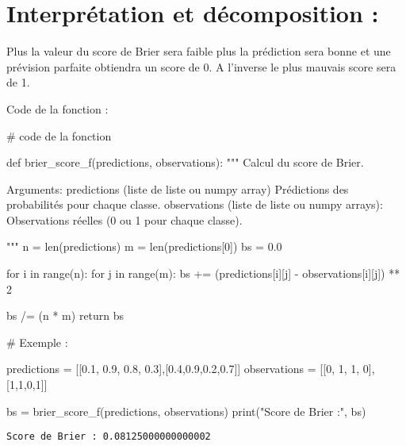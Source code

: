 \documentclass[
  letterpaper,
  DIV=11,
  numbers=noendperiod]{scrartcl}
\newenvironment{Shaded}{\begin{snugshade}}{\end{snugshade}}
\newcommand{\BuiltInTok}[1]{\textcolor[rgb]{0.00,0.23,0.31}{#1}}
\newcommand{\CommentTok}[1]{\textcolor[rgb]{0.37,0.37,0.37}{#1}}
\newcommand{\ControlFlowTok}[1]{\textcolor[rgb]{0.00,0.23,0.31}{#1}}
\newcommand{\DecValTok}[1]{\textcolor[rgb]{0.68,0.00,0.00}{#1}}
\newcommand{\FloatTok}[1]{\textcolor[rgb]{0.68,0.00,0.00}{#1}}
\newcommand{\KeywordTok}[1]{\textcolor[rgb]{0.00,0.23,0.31}{#1}}
\newcommand{\NormalTok}[1]{\textcolor[rgb]{0.00,0.23,0.31}{#1}}
\newcommand{\OperatorTok}[1]{\textcolor[rgb]{0.37,0.37,0.37}{#1}}
\newcommand{\StringTok}[1]{\textcolor[rgb]{0.13,0.47,0.30}{#1}}
\begin{document}
\hypertarget{interpruxe9tation-et-duxe9composition}{%
\section{Interprétation et décomposition
:}\label{interpruxe9tation-et-duxe9composition}}

Plus la valeur du score de Brier sera faible plus la prédiction sera
bonne et une prévision parfaite obtiendra un score de 0. A l'inverse le
plus mauvais score sera de 1.

Code de la fonction :

\begin{Shaded}
\begin{Highlighting}[]
\CommentTok{\# code de la fonction }


\KeywordTok{def}\NormalTok{ brier\_score\_f(predictions, observations):}
    \CommentTok{"""}
\CommentTok{    Calcul du score de Brier.}

\CommentTok{    Arguments:}
\CommentTok{        predictions (liste de liste ou numpy array) Prédictions des probabilités pour chaque classe.}
\CommentTok{        observations (liste de liste ou numpy arrays): Observations réelles (0 ou 1 pour chaque classe).}

\CommentTok{    """}
\NormalTok{    n }\OperatorTok{=} \BuiltInTok{len}\NormalTok{(predictions)}
\NormalTok{    m }\OperatorTok{=} \BuiltInTok{len}\NormalTok{(predictions[}\DecValTok{0}\NormalTok{])}
\NormalTok{    bs }\OperatorTok{=} \FloatTok{0.0}

    \ControlFlowTok{for}\NormalTok{ i }\KeywordTok{in} \BuiltInTok{range}\NormalTok{(n):}
        \ControlFlowTok{for}\NormalTok{ j }\KeywordTok{in} \BuiltInTok{range}\NormalTok{(m):}
\NormalTok{            bs }\OperatorTok{+=}\NormalTok{ (predictions[i][j] }\OperatorTok{{-}}\NormalTok{ observations[i][j]) }\OperatorTok{**} \DecValTok{2}

\NormalTok{    bs }\OperatorTok{/=}\NormalTok{ (n }\OperatorTok{*}\NormalTok{ m)}
    \ControlFlowTok{return}\NormalTok{ bs}


\CommentTok{\# Exemple : }

\NormalTok{predictions }\OperatorTok{=}\NormalTok{ [[}\FloatTok{0.1}\NormalTok{, }\FloatTok{0.9}\NormalTok{, }\FloatTok{0.8}\NormalTok{, }\FloatTok{0.3}\NormalTok{],[}\FloatTok{0.4}\NormalTok{,}\FloatTok{0.9}\NormalTok{,}\FloatTok{0.2}\NormalTok{,}\FloatTok{0.7}\NormalTok{]]}
\NormalTok{observations }\OperatorTok{=}\NormalTok{ [[}\DecValTok{0}\NormalTok{, }\DecValTok{1}\NormalTok{, }\DecValTok{1}\NormalTok{, }\DecValTok{0}\NormalTok{],[}\DecValTok{1}\NormalTok{,}\DecValTok{1}\NormalTok{,}\DecValTok{0}\NormalTok{,}\DecValTok{1}\NormalTok{]]}

\NormalTok{bs }\OperatorTok{=}\NormalTok{ brier\_score\_f(predictions, observations)}
\BuiltInTok{print}\NormalTok{(}\StringTok{"Score de Brier :"}\NormalTok{, bs)}
\end{Highlighting}
\end{Shaded}

\begin{verbatim}
Score de Brier : 0.08125000000000002
\end{verbatim}
\end{document}
